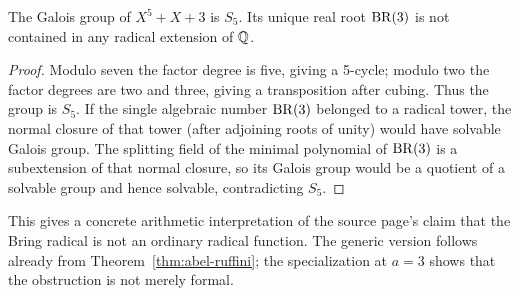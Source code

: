 \begin{theorem}\label{thm:BR3-not-radical}
The Galois group of \(X^5+X+3\) is \(S_5\).  Its unique real root
\(\operatorname{BR}(3)\) is not contained in any radical extension of \(\mathbb Q\).
\end{theorem}

\begin{proof}
Modulo seven the factor degree is five, giving a 5-cycle; modulo two the factor
degrees are two and three, giving a transposition after cubing.  Thus the group
is \(S_5\).  If the single algebraic number \(\operatorname{BR}(3)\) belonged to a radical
tower, the normal closure of that tower (after adjoining roots of unity) would
have solvable Galois group.  The splitting field of the minimal polynomial of
\(\operatorname{BR}(3)\) is a subextension of that normal closure, so its Galois group would
be a quotient of a solvable group and hence solvable, contradicting \(S_5\).
\end{proof}

This gives a concrete arithmetic interpretation of the source page's claim
that the Bring radical is not an ordinary radical function.  The generic
version follows already from Theorem~\ref{thm:abel-ruffini}; the specialization
at \(a=3\) shows that the obstruction is not merely formal.
